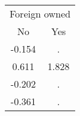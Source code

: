 \begin{tabular}{cc}
\toprule
\multicolumn{2}{c}{Foreign owned} \\
\cmidrule(lr){1-2}
No & Yes \\
\midrule
-0.154 & . \\
0.611 & 1.828 \\
-0.202 & . \\
-0.361 & . \\
\bottomrule
\end{tabular}
